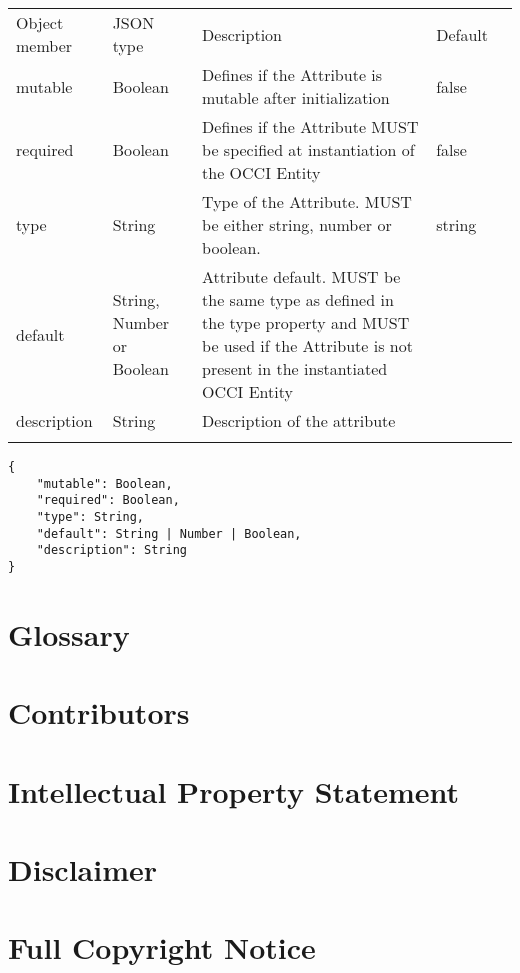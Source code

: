 \documentclass[10pt,a4paper]{article}
\begin{document}
 {
    \begin{tabularx}{\textwidth}{llXll}
    \toprule
    Object member & JSON type & Description & Default \\
    \colrule
    mutable & Boolean & Defines if the Attribute is mutable after initialization
& false \\

    required & Boolean & Defines if the Attribute MUST be specified at
instantiation of the OCCI Entity & false \\

    type & String & Type of the Attribute. MUST be either string, number or
boolean. & string \\


    default & String, Number or Boolean & Attribute default. MUST be the same
type as defined in the type property and MUST  be used if the Attribute is not
present in the instantiated OCCI Entity & \\

    description & String & Description of the attribute & \\
    \botrule
    \end{tabularx}
}
\begin{lstlisting}
{
    "mutable": Boolean,
    "required": Boolean,
    "type": String,
    "default": String | Number | Boolean,
    "description": String
}
\end{lstlisting}

\section{Glossary}
\label{sec:glossary}


\section{Contributors}


\section{Intellectual Property Statement}


\section{Disclaimer}


\section{Full Copyright Notice}




\end{document}
